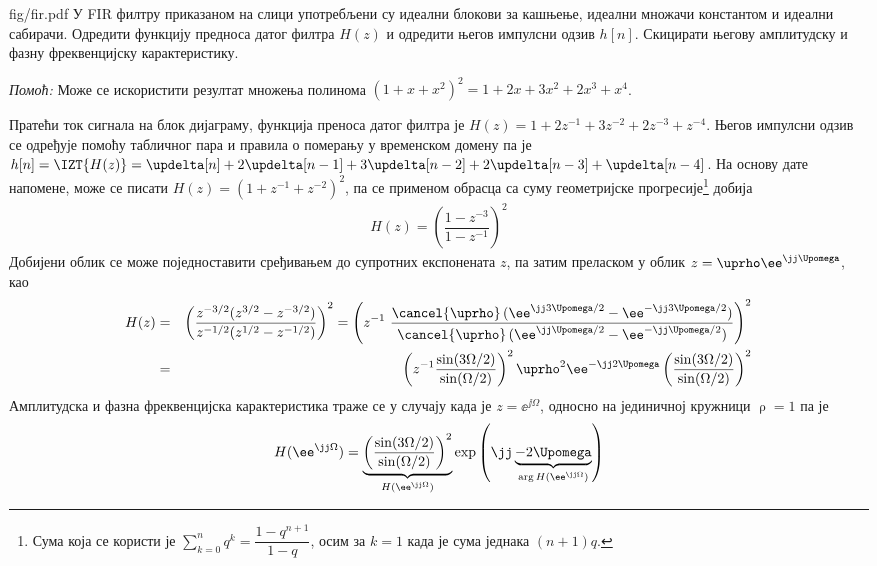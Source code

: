 
\begin{slikaDesno}{fig/fir.pdf}
    \PID У FIR филтру приказаном на слици употребљени су идеални блокови за кашњење, идеални множачи константом и идеални сабирачи.
    Одредити функцију предноса датог филтра $H(z)$ и одредити његов импулсни одзив $h[n]$.
    Скицирати његову амплитудску и фазну фреквенцијску карактеристику.        
\end{slikaDesno}
\textit{Помоћ:} Може се искористити резултат множења полинома $(1 + x + x^2)^2 = 1 + 2x + 3x^2 + 2x^3 + x^4$. 

\RESENJE
Пратећи ток сигнала на блок дијаграму, функција преноса датог филтра је 
$H(z) = 1 + 2 z^{-1} + 3 z^{-2} +  2 z^{-3} + z^{-4}$. Његов импулсни одзив се одређује помоћу 
табличног пара  и правила о померању у временском домену па је 
$h[n] = \IZT{H(z)} = \updelta[n] + 2 \updelta[n-1] + 3\updelta[n-2] + 2\updelta[n-3] + \updelta[n-4]$. 
На основу дате напомене, може се писати $H(z) = (1 + z^{-1} + z^{-2})^2$, па се применом обрасца са суму 
геометријске прогресије\footnote{Сума која се користи је 
$\sum_{k = 0}^n q^k = \dfrac{1 - q^{n+1}}{1 - q}$, осим за  $k = 1$ када је сума једнака $(n+1)q$.
} добија 
\begin{eqnarray}
    H(z) = \left( \dfrac{1 - z^{-3}}{1 - z^{-1}} \right)^2 
\end{eqnarray}
Добијени облик се може поједноставити сређивањем до супротних експонената $z$, па затим преласком 
у облик $z = \uprho \ee^{\jj\Upomega}$, као
\begin{eqnarray}
    H(z) &=& 
    \left( \dfrac{ z^{-3/2} (z^{3/2} - z^{-3/2}) }{ z^{-1/2} (z^{1/2} - z^{-1/2})  } \right)^2
    =
    \left( z^{-1} \,\, \dfrac{ \cancel{\uprho} \, ( \ee^{\jj3\Upomega/2} - \ee^{-\jj3\Upomega/2} ) }{\cancel{\uprho}\,( \ee^{\jj\Upomega/2} - \ee^{-\jj\Upomega/2} )} \right)^2
    \\
    &=&
    \left(
        z^{-1}
        \dfrac{\sin(3\Omega/2)}{\sin(\Omega/2)}
    \right)^2
    \uprho^2 \ee^{-\jj 2\Upomega} 
    \left(
        \dfrac{\sin(3\Omega/2)}{\sin(\Omega/2)}
    \right)^2
\end{eqnarray}
Амплитудска и фазна фреквенцијска карактеристика траже се у случају када је $z = \ee^{\jj\Omega}$, односно на јединичној
кружници $\uprho = 1$ па је 
\begin{eqnarray}
    H(\ee^{\jj\Omega}) = 
    \underbrace{
    \left(
        \dfrac{\sin(3\Omega/2)}{\sin(\Omega/2)}
    \right)^2
    }_{H(\ee^{\jj\Omega})}
    \exp\left(\jj 
    \underbrace{-2\Upomega}_{
        \arg H(\ee^{\jj\Omega})
    } \right)
\end{eqnarray}

